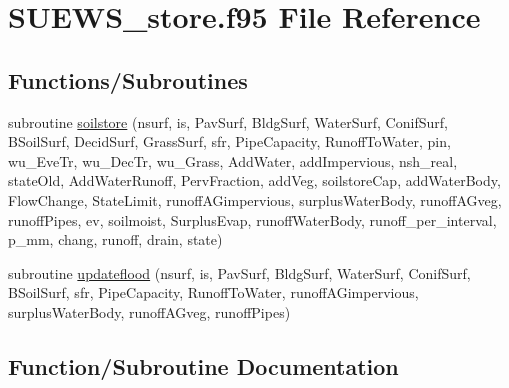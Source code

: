 \hypertarget{_s_u_e_w_s__store_8f95}{}\section{S\+U\+E\+W\+S\+\_\+store.\+f95 File Reference}
\label{_s_u_e_w_s__store_8f95}
\subsection*{Functions/\+Subroutines}
\begin{DoxyCompactItemize}
\item 
subroutine \hyperlink{_s_u_e_w_s__store_8f95_ab8fa354f6cb05440dc295f8d7f099306}{soilstore} (nsurf, is, Pav\+Surf, Bldg\+Surf, Water\+Surf, Conif\+Surf, B\+Soil\+Surf, Decid\+Surf, Grass\+Surf, sfr, Pipe\+Capacity, Runoff\+To\+Water, pin, wu\+\_\+\+Eve\+Tr, wu\+\_\+\+Dec\+Tr, wu\+\_\+\+Grass, Add\+Water, add\+Impervious, nsh\+\_\+real, state\+Old, Add\+Water\+Runoff, Perv\+Fraction, add\+Veg, soilstore\+Cap, add\+Water\+Body, Flow\+Change, State\+Limit, runoff\+A\+Gimpervious, surplus\+Water\+Body, runoff\+A\+Gveg, runoff\+Pipes, ev, soilmoist, Surplus\+Evap, runoff\+Water\+Body, runoff\+\_\+per\+\_\+interval, p\+\_\+mm, chang, runoff, drain, state)
\item 
subroutine \hyperlink{_s_u_e_w_s__store_8f95_a5ff6270aa47b4aa23a5c70e9ce95ca8b}{updateflood} (nsurf, is, Pav\+Surf, Bldg\+Surf, Water\+Surf, Conif\+Surf, B\+Soil\+Surf, sfr, Pipe\+Capacity, Runoff\+To\+Water, runoff\+A\+Gimpervious, surplus\+Water\+Body, runoff\+A\+Gveg, runoff\+Pipes)
\end{DoxyCompactItemize}


\subsection{Function/\+Subroutine Documentation}
\mbox{\label{_s_u_e_w_s__store_8f95_ab8fa354f6cb05440dc295f8d7f099306}} 

